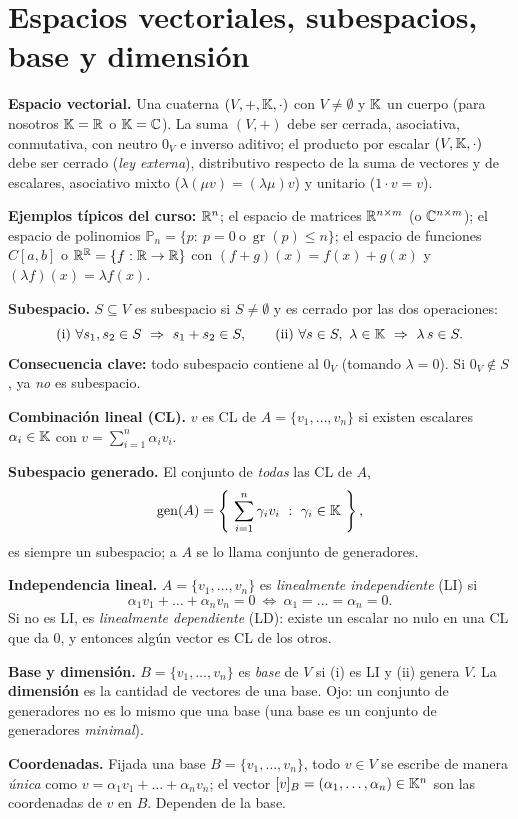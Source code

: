 \section{Espacios vectoriales, subespacios, base y dimensión}

\begin{teoria}
\textbf{Espacio vectorial.} Una cuaterna $(V,+,\mathbb{K},\cdot)$ con $V\neq\emptyset$ y $\mathbb{K}$ un cuerpo (para nosotros $\mathbb{K}=\mathbb{R}$ o $\mathbb{K}=\mathbb{C}$). La suma $(V,+)$ debe ser cerrada, asociativa, conmutativa, con neutro $0_V$ e inverso aditivo; el producto por escalar $(V,\mathbb{K},\cdot)$ debe ser cerrado (\emph{ley externa}), distributivo respecto de la suma de vectores y de escalares, asociativo mixto ($\lambda(\mu v)=(\lambda\mu)v$) y unitario ($1\cdot v=v$).

\smallskip
\noindent\textbf{Ejemplos típicos del curso:} $\mathbb{R}^n$; el espacio de matrices $\mathbb{R}^{n\times m}$ (o $\mathbb{C}^{n\times m}$); el espacio de polinomios $\mathbb{P}_n=\{p:\ p=0\ \text{o}\ \operatorname{gr}(p)\le n\}$; el espacio de funciones $C[a,b]$ o $\mathbb{R}^{\mathbb{R}}=\{f:\mathbb{R}\to\mathbb{R}\}$ con $(f+g)(x)=f(x)+g(x)$ y $(\lambda f)(x)=\lambda f(x)$.

\smallskip
\noindent\textbf{Subespacio.} $S\subseteq V$ es subespacio si $S\neq\emptyset$ y es cerrado por las dos operaciones:
\[
\text{(i)}\ \forall s_1,s_2\in S\ \Rightarrow\ s_1+s_2\in S,\qquad
\text{(ii)}\ \forall s\in S,\ \lambda\in\K\ \Rightarrow\ \lambda\, s\in S.
\]
\textbf{Consecuencia clave:} todo subespacio contiene al $0_V$ (tomando $\lambda=0$). Si $0_V\notin S$, ya \emph{no} es subespacio.

\smallskip
\noindent\textbf{Combinación lineal (CL).} $v$ es CL de $A=\{v_1,\dots,v_n\}$ si existen escalares $\alpha_i\in\mathbb{K}$ con $v=\sum_{i=1}^n\alpha_i v_i$.

\smallskip
\noindent\textbf{Subespacio generado.} El conjunto de \emph{todas} las CL de $A$,
\[
\gen(A)=\left\{\ \sum_{i=1}^n\gamma_i v_i\ :\ \gamma_i\in\K\ \right\},
\]
es siempre un subespacio; a $A$ se lo llama conjunto de generadores.

\smallskip
\noindent\textbf{Independencia lineal.} $A=\{v_1,\dots,v_n\}$ es \emph{linealmente independiente} (LI) si
\[
\alpha_1 v_1+\dots+\alpha_n v_n=0\ \iff\ \alpha_1=\dots=\alpha_n=0.
\]
Si no es LI, es \emph{linealmente dependiente} (LD): existe un escalar no nulo en una CL que da $0$, y entonces algún vector es CL de los otros.

\smallskip
\noindent\textbf{Base y dimensión.} $B=\{v_1,\dots,v_n\}$ es \emph{base} de $V$ si (i) es LI y (ii) genera $V$. La \textbf{dimensión} es la cantidad de vectores de una base. Ojo: un conjunto de generadores no es lo mismo que una base (una base es un conjunto de generadores \emph{minimal}).

\smallskip
\noindent\textbf{Coordenadas.} Fijada una base $B=\{v_1,\dots,v_n\}$, todo $v\in V$ se escribe de manera \emph{única} como $v=\alpha_1 v_1+\dots+\alpha_n v_n$; el vector $[v]_B=(\alpha_1,\dots,\alpha_n)\in\mathbb{K}^n$ son las coordenadas de $v$ en $B$. Dependen de la base.
\end{teoria}

